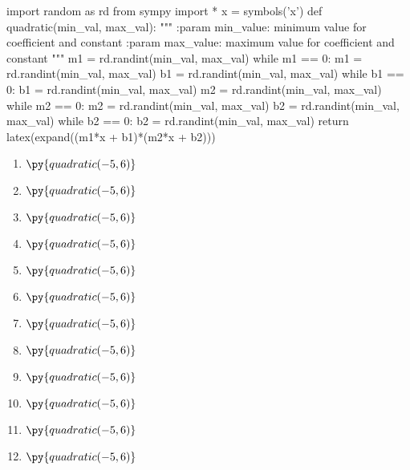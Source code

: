 \documentclass{article}
\begin{document}
\begin{pycode}
import random as rd
from sympy import *
x = symbols('x')
def quadratic(min_val, max_val):
    """
    :param min_value: minimum value for coefficient and constant
    :param max_value: maximum value for coefficient and constant
    """
    m1 = rd.randint(min_val, max_val)
    while m1 == 0:
        m1 = rd.randint(min_val, max_val)
    b1 = rd.randint(min_val, max_val)
    while b1 == 0:
        b1 = rd.randint(min_val, max_val)
    m2 = rd.randint(min_val, max_val)
    while m2 == 0:
        m2 = rd.randint(min_val, max_val)
    b2 = rd.randint(min_val, max_val)
    while b2 == 0:
        b2 = rd.randint(min_val, max_val)
    return latex(expand((m1*x + b1)*(m2*x + b2)))
\end{pycode}

\begin{enumerate}
\item $\py{quadratic(-5,6)}$
\item $\py{quadratic(-5,6)}$
\item $\py{quadratic(-5,6)}$
\item $\py{quadratic(-5,6)}$
\item $\py{quadratic(-5,6)}$
\item $\py{quadratic(-5,6)}$
\item $\py{quadratic(-5,6)}$
\item $\py{quadratic(-5,6)}$
\item $\py{quadratic(-5,6)}$
\item $\py{quadratic(-5,6)}$
\item $\py{quadratic(-5,6)}$
\item $\py{quadratic(-5,6)}$
\end{enumerate}
\end{document}
